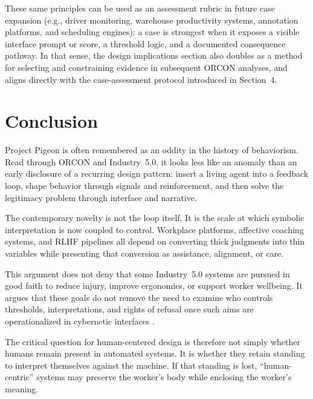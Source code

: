 \documentclass[runningheads]{llncs}
\begin{document}
These same principles can be used as an assessment rubric in future case expansion (e.g., driver monitoring, warehouse productivity systems, annotation platforms, and scheduling engines): a case is strongest when it exposes a visible interface prompt or score, a threshold logic, and a documented consequence pathway. In that sense, the design implications section also doubles as a method for selecting and constraining evidence in subsequent ORCON analyses, and aligns directly with the case-assessment protocol introduced in Section~4.

\section{Conclusion}

Project Pigeon is often remembered as an oddity in the history of behaviorism. Read through ORCON and Industry~5.0, it looks less like an anomaly than an early disclosure of a recurring design pattern: insert a living agent into a feedback loop, shape behavior through signals and reinforcement, and then solve the legitimacy problem through interface and narrative.

The contemporary novelty is not the loop itself. It is the scale at which symbolic interpretation is now coupled to control. Workplace platforms, affective coaching systems, and RLHF pipelines all depend on converting thick judgments into thin variables while presenting that conversion as assistance, alignment, or care.

This argument does not deny that some Industry~5.0 systems are pursued in good faith to reduce injury, improve ergonomics, or support worker wellbeing. It argues that these goals do not remove the need to examine who controls thresholds, interpretations, and rights of refusal once such aims are operationalized in cybernetic interfaces \cite{breque2021industry}.

The critical question for human-centered design is therefore not simply whether humans remain present in automated systems. It is whether they retain standing to interpret themselves against the machine. If that standing is lost, ``human-centric'' systems may preserve the worker's body while enclosing the worker's meaning.
\end{document}

